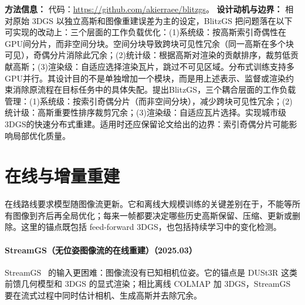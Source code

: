 \textbf{方法信息：} 代码：\url{https://github.com/akierraee/blitzgs}。
\textbf{设计动机与边界：} 相对原始 3DGS 以独立高斯和图像重建误差为主的设定，BlitzGS 把问题落在以下可实现的改动上：三个层面的工作负载优化：(1)系统级：按高斯索引奇偶性在GPU间分片，而非空间分块。空间分块导致跨块可见性冗余（同一高斯在多个块可见），奇偶分片消除此冗余；(2)统计级：根据高斯对渲染的贡献排序，裁剪低贡献高斯；(3)渲染级：自适应选择渲染瓦片，跳过不可见区域。分布式训练支持多GPU并行。其设计目的不是单独增加一个模块，而是用上述表示、监督或渲染约束消除原流程在目标任务中的具体失配。提出BlitzGS，三个耦合层面的工作负载管理：(1)系统级：按索引奇偶分片（而非空间分块），减少跨块可见性冗余；(2)统计级：高斯重要性排序裁剪冗余；(3)渲染级：自适应瓦片选择。实现城市级3DGS的快速分布式重建。适用时还应保留论文给出的边界：索引奇偶分片可能影响局部优化质量。

\section{在线与增量重建}

在线路线要求模型随图像流更新。它和离线大规模训练的关键差别在于，不能等所有图像到齐后再全局优化；每来一帧都要决定哪些历史高斯保留、压缩、更新或删除。这里的锚点既包括 feed-forward 3DGS，也包括持续学习中的变化检测。
\paragraph{StreamGS（无位姿图像流的在线重建）（2025.03）}
StreamGS~\cite{2503_06235} 的输入更困难：图像流没有已知相机位姿。它的锚点是 DUSt3R 这类前馈几何模型和 3DGS 的显式渲染；相比离线 COLMAP 加 3DGS，StreamGS 要在流式过程中同时估计相机、生成高斯并去除冗余。

